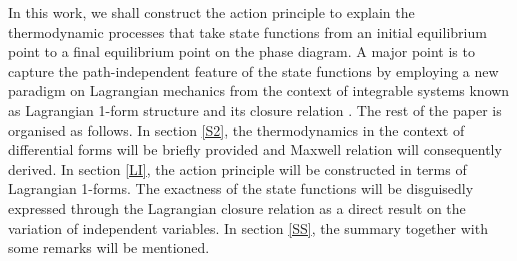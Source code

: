 \documentclass[12pt]{article}
\numberwithin{equation}{section}
\theoremstyle{remark}
\theoremstyle{definition}
\begin{document}
 In this work, we shall construct the action principle to explain the thermodynamic processes that take state functions from an initial equilibrium point to a final equilibrium point on the phase diagram. A major point is to capture the path-independent feature of the state functions by employing a new paradigm on Lagrangian mechanics from the context of integrable systems known as Lagrangian 1-form structure and its closure relation \cite{Frank}. The rest of the paper is organised as follows. In section \ref{S2}, the thermodynamics in the context of differential forms will be briefly provided and Maxwell relation will consequently derived. In section \ref{LI}, the action principle will be constructed in terms of Lagrangian 1-forms. The exactness of the state functions will be disguisedly expressed through the Lagrangian closure relation as a direct result on the variation of independent variables. In section \ref{SS}, the summary together with some remarks will be mentioned.
\end{document}
